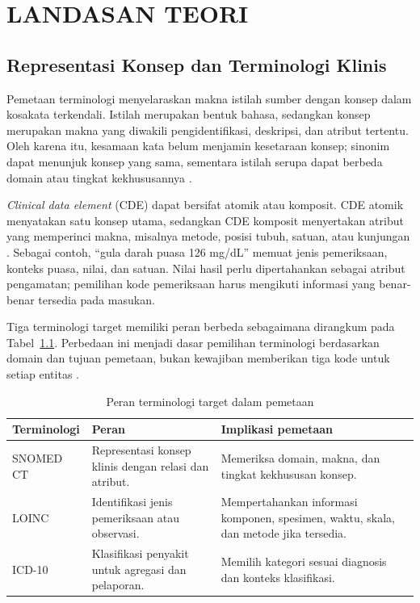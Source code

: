 \chapter{LANDASAN TEORI}

\section{Representasi Konsep dan Terminologi Klinis}

Pemetaan terminologi menyelaraskan makna istilah sumber dengan konsep dalam kosakata terkendali. Istilah merupakan bentuk bahasa, sedangkan konsep merupakan makna yang diwakili pengidentifikasi, deskripsi, dan atribut tertentu. Oleh karena itu, kesamaan kata belum menjamin kesetaraan konsep; sinonim dapat menunjuk konsep yang sama, sementara istilah serupa dapat berbeda domain atau tingkat kekhususannya \citep{cimino_desiderata_1998,schulz_stefan_interface_2017}.

\textit{Clinical data element} (CDE) dapat bersifat atomik atau komposit. CDE atomik menyatakan satu konsep utama, sedangkan CDE komposit menyertakan atribut yang memperinci makna, misalnya metode, posisi tubuh, satuan, atau kunjungan \citep{gilani_cde-mapper_2025}. Sebagai contoh, ``gula darah puasa 126 mg/dL'' memuat jenis pemeriksaan, konteks puasa, nilai, dan satuan. Nilai hasil perlu dipertahankan sebagai atribut pengamatan; pemilihan kode pemeriksaan harus mengikuti informasi yang benar-benar tersedia pada masukan.

Tiga terminologi target memiliki peran berbeda sebagaimana dirangkum pada Tabel~\ref{tab:peran-terminologi-target}. Perbedaan ini menjadi dasar pemilihan terminologi berdasarkan domain dan tujuan pemetaan, bukan kewajiban memberikan tiga kode untuk setiap entitas \citep{de_lusignan_codes_2005,schulz_stefan_interface_2017,ayuningtyas_bringing_2025}.

\begin{table}[htbp]
\centering
\small
\caption{Peran terminologi target dalam pemetaan}
\label{tab:peran-terminologi-target}
\begin{tabularx}{\textwidth}{@{}>{\raggedright\arraybackslash}p{2cm} >{\raggedright\arraybackslash}X >{\raggedright\arraybackslash}X@{}}
\toprule
\textbf{Terminologi} & \textbf{Peran} & \textbf{Implikasi pemetaan} \\
\midrule
SNOMED CT & Representasi konsep klinis dengan relasi dan atribut. & Memeriksa domain, makna, dan tingkat kekhususan konsep. \\
LOINC & Identifikasi jenis pemeriksaan atau observasi. & Mempertahankan informasi komponen, spesimen, waktu, skala, dan metode jika tersedia. \\
ICD-10 & Klasifikasi penyakit untuk agregasi dan pelaporan. & Memilih kategori sesuai diagnosis dan konteks klasifikasi. \\
\bottomrule
\end{tabularx}
\end{table}


